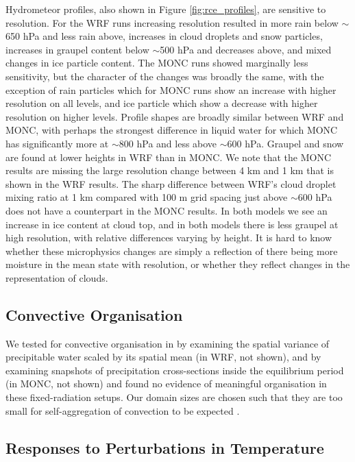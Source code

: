 \documentclass[draft]{agujournal2019}
\begin{document}
Hydrometeor profiles, also shown in Figure \ref{fig:rce_profiles}, are sensitive
to resolution. For the WRF runs increasing resolution resulted in more rain
below $\sim$650 hPa and less rain above, increases in cloud droplets and snow
particles, increases in graupel content below $\sim$500 hPa and decreases above,
and mixed changes in ice particle content. The MONC runs showed marginally less
sensitivity, but the character of the changes was broadly the same, with the
exception of rain particles which for MONC runs show an increase with higher
resolution on all levels, and ice particle which show a decrease with higher
resolution on higher levels. Profile shapes are broadly similar between WRF and
MONC, with perhaps the strongest difference in liquid water for which MONC has
significantly more at $\sim$800 hPa and less above $\sim$600 hPa. Graupel and
snow are found at lower heights in WRF than in MONC. We note that the MONC
results are missing the large resolution change between 4 km and 1 km that is
shown in the WRF results. The sharp difference between WRF's cloud droplet
mixing ratio at 1 km compared with 100 m grid spacing just above $\sim$600 hPa
does not have a counterpart in the MONC results. In both models we see an
increase in ice content at cloud top, and in both models there is less graupel
at high resolution, with relative differences varying by height. It is hard to
know whether these microphysics changes are simply a reflection of there being
more moisture in the mean state with resolution, or whether they reflect changes
in the representation of clouds.

\subsection{Convective Organisation}

We tested for convective organisation in by examining the spatial variance of
precipitable water scaled by its spatial mean (in WRF, not shown), and by
examining snapshots of precipitation cross-sections inside the equilibrium
period (in MONC, not shown) and found no evidence of meaningful organisation in
these fixed-radiation setups. Our domain sizes are chosen such that they are
too small for self-aggregation of convection to be expected
\cite{Muller_JAS_2012}.

\subsection{Responses to Perturbations in Temperature}
\end{document}
